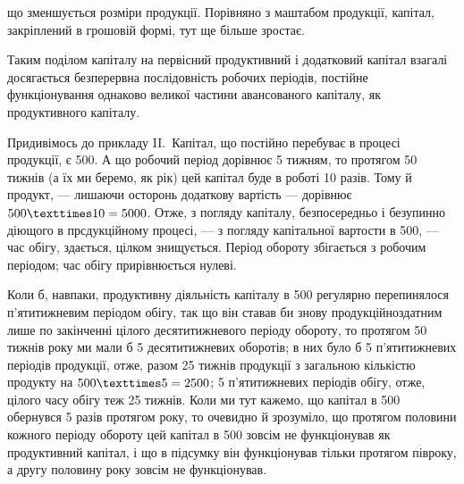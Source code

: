 \parcont{}  %
що зменшується розміри продукції. Порівняно з маштабом продукції, капітал,
закріплений в грошовій формі, тут ще більше зростає.

Таким поділом капіталу на первісний продуктивний і додатковий капітал
взагалі досягається безперервна послідовність робочих періодів, постійне
функціонування однаково великої частини авансованого капіталу,
як продуктивного капіталу.

Придивімось до прикладу II.~Капітал, що постійно перебуває в процесі
продукції, є 500. А що робочий період дорівнює 5 тижням,
то протягом 50 тижнів (а їх ми беремо, як рік) цей капітал буде в
роботі 10 разів. Тому й продукт, — лишаючи осторонь додаткову вартість
— дорівнює $500 × 10 \deq{} 5000$. Отже, з погляду капіталу,
безпосередньо і безупинно діющого в прсдукційному процесі, — з погляду
капітальної вартости в 500, — час обігу, здається, цілком
знищується. Період обороту збігається з робочим періодом; час обігу прирівнюється
нулеві.

Коли б, навпаки, продуктивну діяльність капіталу в 500 регулярно
перепинялося п’ятитижневим періодом обігу, так що він ставав
би знову продукційноздатним лише по закінченні цілого десятитижневого
періоду обороту, то протягом 50 тижнів року ми мали б 5 десятитижневих
оборотів; в них було б 5 п’ятитижневих періодів продукції, отже,
разом 25 тижнів продукції з загальною кількістю продукту на $500 × 5 \deq{} 2500$; 5 п’ятитижневих періодів обігу, отже, цілого часу обігу теж
25 тижнів. Коли ми тут кажемо, що капітал в 500 обернувся
5 разів протягом року, то очевидно й зрозуміло, що протягом половини
кожного періоду обороту цей капітал в 500 зовсім не функціонував
як продуктивний капітал, і що в підсумку він функціонував тільки
протягом півроку, а другу половину року зовсім не функціонував.

